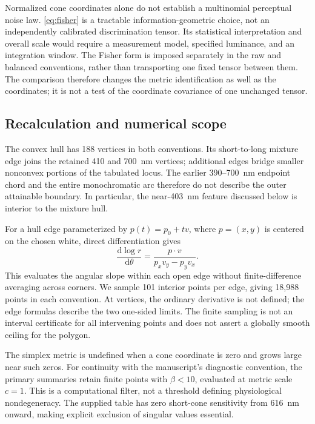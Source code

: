 \documentclass[9pt,twocolumn,twoside]{opticajnl}
\theoremstyle{plain}
\newcommand{\dd}{\mathrm{d}}
\begin{document}
Normalized cone coordinates alone do not establish a multinomial perceptual noise law. \eqref{eq:fisher} is a tractable information-geometric choice, not an independently calibrated discrimination tensor. Its statistical interpretation and overall scale would require a measurement model, specified luminance, and an integration window. The Fisher form is imposed separately in the raw and balanced conventions, rather than transporting one fixed tensor between them. The comparison therefore changes the metric identification as well as the coordinates; it is not a test of the coordinate covariance of one unchanged tensor.

\subsection{Recalculation and numerical scope}
The convex hull has 188 vertices in both conventions. Its short-to-long mixture edge joins the retained 410 and 700~nm vertices; additional edges bridge smaller nonconvex portions of the tabulated locus. The earlier 390--700~nm endpoint chord and the entire monochromatic arc therefore do not describe the outer attainable boundary. In particular, the near-403~nm feature discussed below is interior to the mixture hull.

For a hull edge parameterized by $p(t)=p_0+tv$, where $p=(x,y)$ is centered on the chosen white, direct differentiation gives
\begin{equation}
 \frac{\dd\log r}{\dd\theta}
 =\frac{p\mathbin{\cdot}v}{p_xv_y-p_yv_x}.
 \label{eq:edge-derivative}
\end{equation}
This evaluates the angular slope within each open edge without finite-difference averaging across corners. We sample 101 interior points per edge, giving 18,988 points in each convention. At vertices, the ordinary derivative is not defined; the edge formulas describe the two one-sided limits. The finite sampling is not an interval certificate for all intervening points and does not assert a globally smooth ceiling for the polygon.

The simplex metric is undefined when a cone coordinate is zero and grows large near such zeros. For continuity with the manuscript's diagnostic convention, the primary summaries retain finite points with $\beta<10$, evaluated at metric scale $c=1$. This is a computational filter, not a threshold defining physiological nondegeneracy. The supplied table has zero short-cone sensitivity from 616~nm onward, making explicit exclusion of singular values essential.
\end{document}

